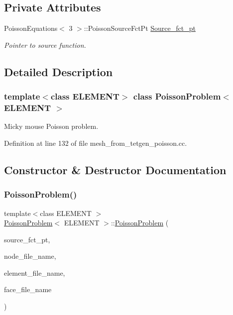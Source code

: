 \subsection*{Private Attributes}
\begin{DoxyCompactItemize}
\item 
Poisson\+Equations$<$ 3 $>$\+::Poisson\+Source\+Fct\+Pt \hyperlink{classPoissonProblem_adb4236a955db3200605ef5f9d7410a93}{Source\+\_\+fct\+\_\+pt}
\begin{DoxyCompactList}\small\item\em Pointer to source function. \end{DoxyCompactList}\end{DoxyCompactItemize}


\subsection{Detailed Description}
\subsubsection*{template$<$class E\+L\+E\+M\+E\+NT$>$\newline
class Poisson\+Problem$<$ E\+L\+E\+M\+E\+N\+T $>$}

Micky mouse Poisson problem. 

Definition at line 132 of file mesh\+\_\+from\+\_\+tetgen\+\_\+poisson.\+cc.



\subsection{Constructor \& Destructor Documentation}
\mbox{\label{classPoissonProblem_aef77f2373369411af651d8b6fa955780}} 
\subsubsection{\texorpdfstring{Poisson\+Problem()}{PoissonProblem()}}
{\footnotesize\ttfamily template$<$class E\+L\+E\+M\+E\+NT $>$ \\
\hyperlink{classPoissonProblem}{Poisson\+Problem}$<$ E\+L\+E\+M\+E\+NT $>$\+::\hyperlink{classPoissonProblem}{Poisson\+Problem} (\begin{DoxyParamCaption}\item[{Poisson\+Equations$<$ 3 $>$\+::Poisson\+Source\+Fct\+Pt}]{source\+\_\+fct\+\_\+pt,  }\item[{const string \&}]{node\+\_\+file\+\_\+name,  }\item[{const string \&}]{element\+\_\+file\+\_\+name,  }\item[{const string \&}]{face\+\_\+file\+\_\+name }\end{DoxyParamCaption})}



